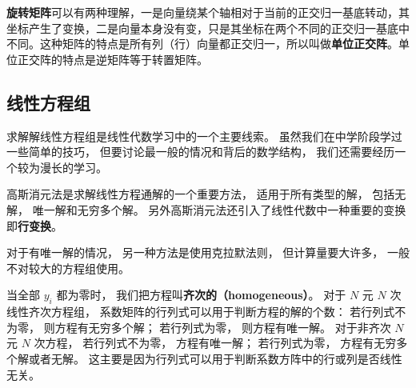 
\textbf{旋转矩阵}可以有两种理解，一是向量绕某个轴相对于当前的正交归一基底转动，其坐标产生了变换，二是向量本身没有变，只是其坐标在两个不同的正交归一基底中不同。这种矩阵的特点是所有列（行）向量都正交归一，所以叫做\textbf{单位正交阵}。单位正交阵的特点是逆矩阵等于转置矩阵。






\subsection{线性方程组}

求解解线性方程组是线性代数学习中的一个主要线索。 虽然我们在中学阶段学过一些简单的技巧， 但要讨论最一般的情况和背后的数学结构， 我们还需要经历一个较为漫长的学习。

高斯消元法是求解线性方程通解的一个重要方法， 适用于所有类型的解， 包括无解， 唯一解和无穷多个解。 另外高斯消元法还引入了线性代数中一种重要的变换即\textbf{行变换}。

对于有唯一解的情况， 另一种方法是使用克拉默法则， 但计算量要大许多， 一般不对较大的方程组使用。

当全部 $y_i$ 都为零时， 我们把方程叫\textbf{齐次的（homogeneous）}。 对于 $N$ 元 $N$ 次线性齐次方程组， 系数矩阵的行列式可以用于判断方程的解的个数： 若行列式不为零， 则方程有无穷多个解； 若行列式为零， 则方程有唯一解。 对于非齐次 $N$ 元 $N$ 次方程， 若行列式不为零， 方程有唯一解； 若行列式为零， 方程有无穷多个解或者无解。 这主要是因为行列式可以用于判断系数方阵中的行或列是否线性无关。 %

